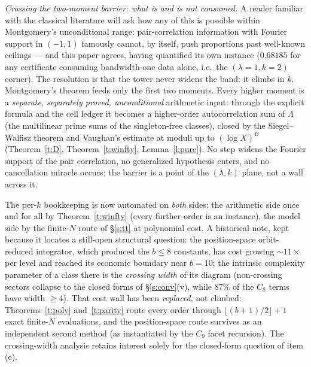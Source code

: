 \documentclass[11pt]{article}
\numberwithin{equation}{section}
\theoremstyle{definition}
\theoremstyle{remark}
\begin{document}
\medskip
\noindent\emph{Crossing the two-moment barrier: what is and
is not consumed.} A reader familiar with the classical
literature will ask how any of this is possible within
Montgomery's unconditional range: pair-correlation
information with Fourier support in $(-1,1)$ famously cannot,
by itself, push proportions past well-known ceilings --- and
this paper agrees, having quantified its own instance
($0.68185$ for any certificate consuming bandwidth-one data
alone, i.e.\ the $(\lambda{=}1,k{=}2)$ corner). The
resolution is that the tower never widens the band: it
climbs in $k$. Montgomery's theorem feeds only the first
two moments. Every higher moment is a \emph{separate,
separately proved, unconditional} arithmetic input: through
the explicit formula and the cell ledger it becomes a
higher-order autocorrelation sum of $\Lambda$ (the
multilinear prime sums of the singleton-free classes),
closed by the Siegel--Walfisz theorem and Vaughan's estimate
at moduli up to $(\log X)^{B}$ (Theorem~\ref{t:D},
Theorem~\ref{t:winfty}, Lemma~\ref{l:pure}). No step widens
the Fourier support of the pair correlation, no generalized
hypothesis enters, and no cancellation miracle occurs; the
barrier is a point of the $(\lambda,k)$ plane, not a wall
across it.

\medskip
\noindent The per-$k$ bookkeeping is now automated on \emph{both}
sides: the arithmetic side once and for all by
Theorem~\ref{t:winfty} (every further order is an instance),
the model side by the finite-$N$ route of \S\ref{s:tt} at
polynomial cost. A historical note, kept because it locates
a still-open structural question: the position-space
orbit-reduced integrator, which produced the $b\le8$
constants, has cost growing $\sim11\times$ per level and
reached its economic boundary near $b=10$; the intrinsic
complexity parameter of a class there is the \emph{crossing
width} of its diagram (non-crossing sectors collapse to the
closed forms of \S\ref{s:conv}(v), while $87\%$ of the $C_8$
terms have width $\ge4$). That cost wall has been
\emph{replaced}, not climbed: Theorems~\ref{t:poly}
and~\ref{t:parity} route every order through
$\lfloor(b{+}1)/2\rfloor+1$ exact finite-$N$ evaluations,
and the position-space route survives as an independent
second method (as instantiated by the $C_9$ facet
recursion). The crossing-width analysis retains interest
solely for the closed-form question of item (e).
\end{document}
